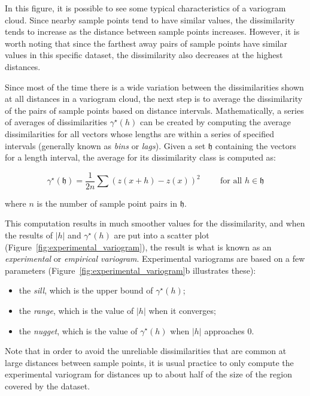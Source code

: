 In this figure, it is possible to see some typical characteristics of a variogram cloud.
Since nearby sample points tend to have similar values, the dissimilarity tends to increase as the distance between sample points increases.
However, it is worth noting that since the farthest away pairs of sample points have similar values in this specific dataset, the dissimilarity also decreases at the highest distances.

Since most of the time there is a wide variation between the dissimilarities shown at all distances in a variogram cloud, the next step is to average the dissimilarity of the pairs of sample points based on distance intervals.
Mathematically, a series of averages of dissimilarities \(\gamma^\star(h)\) can be created by computing the average dissimilarities for all vectors whose lengths are within a series of specified intervals (generally known as \emph{bins} or \emph{lags}).
Given a set \(\mathfrak{h}\) containing the vectors for a length interval, the average for its dissimilarity class is computed as:

\begin{equation}
\gamma^\star(\mathfrak{h}) = \frac{1}{2n}\sum\left(z\left(x+h\right)-z\left(x\right)\right)^2 \hspace{1cm}\text{for all } h \in \mathfrak{h}
\end{equation}

where \(n\) is the number of sample point pairs in \(\mathfrak{h}\).

This computation results in much smoother values for the dissimilarity, and when the results of \(|h|\) and \(\gamma^\star(h)\) are put into a scatter plot (Figure~\ref{fig:experimental_variogram}), the result is what is known as an \emph{experimental} or \emph{empirical variogram}.
Experimental variograms are based on a few parameters (Figure~\ref{fig:experimental_variogram}b illustrates these): 
\begin{itemize}
  \item the \emph{sill}, which is the upper bound of \(\gamma^\star(h)\);
  \item the \emph{range}, which is the value of \(|h|\) when it converges; 
  \item the \emph{nugget}, which is the value of \(\gamma^\star(h)\) when \(|h|\) approaches 0.
\end{itemize}
Note that in order to avoid the unreliable dissimilarities that are common at large distances between sample points, it is usual practice to only compute the experimental variogram for distances up to about half of the size of the region covered by the dataset.

